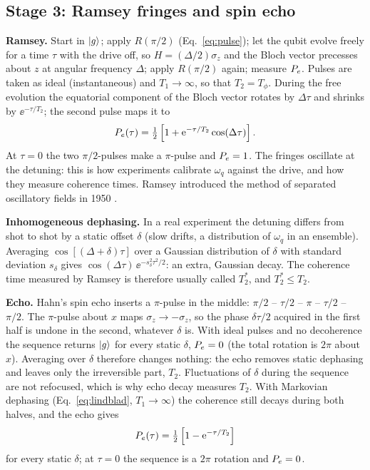 \subsection{Stage 3: Ramsey fringes and spin echo}\label{sec:stage3}

\textbf{Ramsey.} Start in $\ket{g}$; apply $R(\pi/2)$ (Eq.~\eqref{eq:pulse}); let the qubit
evolve freely for a time $\tau$ with the drive off, so $H = (\Delta/2)\sigma_z$ and the
Bloch vector precesses about $z$ at angular frequency $\Delta$; apply $R(\pi/2)$ again;
measure $P_e$. Pulses are taken as ideal (instantaneous) and $T_1 \to \infty$, so that
$T_2 = T_\phi$. During the free evolution the equatorial component of the Bloch vector
rotates by $\Delta\tau$ and shrinks by $\ee^{-\tau/T_2}$; the second pulse maps it to
\begin{equation}\label{eq:ramsey}
  P_e(\tau) = \tfrac12\left[1 + \mathrm{e}^{-\tau/T_2}\cos(\Delta\tau)\right].
\end{equation}
At $\tau = 0$ the two $\pi/2$-pulses make a $\pi$-pulse and $P_e = 1$. The fringes
oscillate at the detuning: this is how experiments calibrate $\omega_q$ against the drive,
and how they measure coherence times. Ramsey introduced the method of separated
oscillatory fields in 1950 .

\textbf{Inhomogeneous dephasing.} In a real experiment the detuning differs from shot to
shot by a static offset $\delta$ (slow drifts, a distribution of $\omega_q$ in an ensemble).
Averaging $\cos[(\Delta + \delta)\tau]$ over a Gaussian distribution of $\delta$ with
standard deviation $s_\delta$ gives $\cos(\Delta\tau)\,\ee^{-s_\delta^2\tau^2/2}$: an extra,
Gaussian decay. The coherence time measured by Ramsey is therefore usually called
$T_2^\ast$, and $T_2^\ast \leq T_2$.

\textbf{Echo.} Hahn's spin echo  inserts a $\pi$-pulse in the middle:
$\pi/2$ -- $\tau/2$ -- $\pi$ -- $\tau/2$ -- $\pi/2$. The $\pi$-pulse about $x$ maps
$\sigma_z \to -\sigma_z$, so the phase $\delta\tau/2$ acquired in the first half is undone
in the second, whatever $\delta$ is. With ideal pulses and no decoherence the sequence
returns $\ket{g}$ for every static $\delta$, $P_e = 0$ (the total rotation is $2\pi$
about $x$). Averaging over $\delta$ therefore changes nothing: the echo removes static
dephasing and leaves only the irreversible part, $T_2$. Fluctuations of $\delta$ during
the sequence are not refocused, which is why echo decay measures $T_2$. With Markovian
dephasing (Eq.~\eqref{eq:lindblad}, $T_1 \to \infty$) the coherence still decays during
both halves, and the echo gives
\begin{equation}\label{eq:echo}
  P_e(\tau) = \tfrac12\left[1 - \mathrm{e}^{-\tau/T_2}\right]
\end{equation}
for every static $\delta$; at $\tau = 0$ the sequence is a $2\pi$ rotation and $P_e = 0$.

